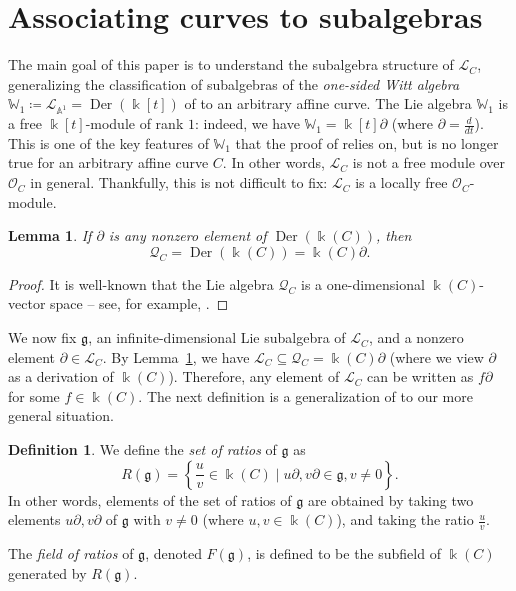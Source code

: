 \documentclass[12pt]{amsart}
\theoremstyle{plain}
\newtheorem{lemma}[theorem]{Lemma}
\theoremstyle{definition}
\newtheorem{definition}[theorem]{Definition}
\numberwithin{equation}{section}
\def\g{\mathfrak{g}}
\def\L{\mathcal{L}}
\def\O{\mathcal{O}}
\def\Q{\mathcal{Q}}
\def\Aa{\mathbb{A}}
\def\WW{\mathbb{W}}
\def\kk{\Bbbk}
\DeclareMathOperator{\Der}{Der}
\def\del{\partial}
\newcommand{\diff}[1]{\frac{d}{d#1}}
\begin{document}
\section{Associating curves to subalgebras}\label{sec:new curve D}

The main goal of this paper is to understand the subalgebra structure of $\L_C$, generalizing the classification of subalgebras of the \emph{one-sided Witt algebra} $\WW_1 \coloneqq \L_{\Aa^1} = \Der(\kk[t])$ of \cite{BellBuzaglo} to an arbitrary affine curve. The Lie algebra $\WW_1$ is a free $\kk[t]$-module of rank $1$: indeed, we have $\WW_1 = \kk[t]\del$ (where $\del = \diff{t}$). This is one of the key features of $\WW_1$ that the proof of \cite[Theorem 2.8]{BellBuzaglo} relies on, but is no longer true for an arbitrary affine curve $C$. In other words, $\L_C$ is not a free module over $\O_C$ in general. Thankfully, this is not difficult to fix: $\L_C$ is a locally free $\O_C$-module.

\begin{lemma}\label{lem:Q_C is one-dimensional}
    If $\del$ is any nonzero element of $\Der(\kk(C))$, then
    $$\Q_C = \Der(\kk(C)) = \kk(C)\del.$$
\end{lemma}
\begin{proof}
    It is well-known that the Lie algebra $\Q_C$ is a one-dimensional $\kk(C)$-vector space -- see, for example, \cite[Example 15.2.3]{McConnellRobson}.
\end{proof}

We now fix $\g$, an infinite-dimensional Lie subalgebra of $\L_C$, and a nonzero element $\del \in \L_C$. By Lemma~\ref{lem:Q_C is one-dimensional}, we have $\L_C \subseteq \Q_C = \kk(C)\del$ (where we view $\del$ as a derivation of $\kk(C)$). Therefore, any element of $\L_C$ can be written as $f\del$ for some $f \in \kk(C)$. The next definition is a generalization of \cite[Definition 5.2]{Buzaglo} to our more general situation.

\begin{definition}\label{def:ratios}
    We define the \emph{set of ratios} of $\g$ as
    $$R(\g) = \left\{\frac{u}{v} \in \kk(C) \mid u\del,v\del \in \g, v \neq 0\right\}.$$
    In other words, elements of the set of ratios of $\g$ are obtained by taking two elements $u\del, v\del$ of $\g$ with $v \neq 0$ (where $u,v \in \kk(C)$), and taking the ratio $\frac{u}{v}$.

    The \emph{field of ratios} of $\g$, denoted $F(\g)$, is defined to be the subfield of $\kk(C)$ generated by $R(\g)$.
\end{definition}
\end{document}
